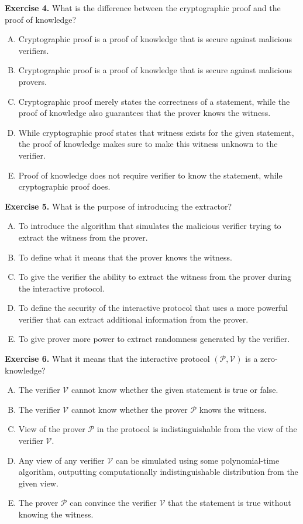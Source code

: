 \documentclass[../lecture-notes-148x210.tex]{subfiles}
\begin{document}
\textbf{Exercise 4.} What is the difference between the cryptographic proof and the proof of knowledge?
\begin{enumerate}[(A)]
    \item Cryptographic proof is a proof of knowledge that is secure against malicious verifiers.
    \item Cryptographic proof is a proof of knowledge that is secure against malicious provers.
    \item Cryptographic proof merely states the correctness of a statement, while the proof of knowledge also guarantees that the prover knows the witness.
    \item While cryptographic proof states that witness exists for the given statement, the proof of knowledge makes sure to make this witness unknown to the verifier.
    \item Proof of knowledge does not require verifier to know the statement, while cryptographic proof does.
\end{enumerate}

\textbf{Exercise 5.} What is the purpose of introducing the extractor?
\begin{enumerate}[(A)]
    \item To introduce the algorithm that simulates the malicious verifier trying to extract the witness from the prover.
    \item To define what it means that the prover knows the witness.
    \item To give the verifier the ability to extract the witness from the prover during the interactive protocol.
    \item To define the security of the interactive protocol that uses a more powerful verifier that can extract additional information from the prover.
    \item To give prover more power to extract randomness generated by the verifier.
\end{enumerate}

\textbf{Exercise 6.} What it means that the interactive protocol $(\mathcal{P}, \mathcal{V})$ is a zero-knowledge?
\begin{enumerate}[(A)]
    \item The verifier $\mathcal{V}$ cannot know whether the given statement is true or false.
    \item The verifier $\mathcal{V}$ cannot know whether the prover $\mathcal{P}$ knows the witness.
    \item View of the prover $\mathcal{P}$ in the protocol is indistinguishable from the view of the verifier $\mathcal{V}$.
    \item Any view of any verifier $\mathcal{V}$ can be simulated using some polynomial-time algorithm, outputting computationally indistinguishable distribution from the given view.
    \item The prover $\mathcal{P}$ can convince the verifier $\mathcal{V}$ that the statement is true without knowing the witness.
 \end{enumerate}
\end{document}

